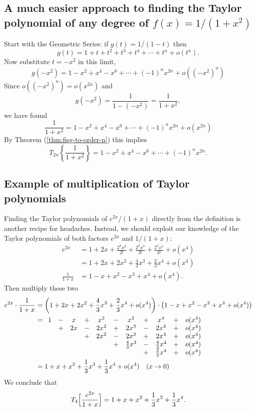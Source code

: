 \subsection{A much easier approach to finding the Taylor polynomial of \textbf{any} degree of $f(x)=1/ (1+x^2)$} %
Start with the Geometric Series: if $g(t)=1/ (1-t)$ then
\[
g(t)=1+t+t^2+t^3+t^4+\cdots+ t^n +o (t^n).
\]
Now substitute $t=-x^2$ in this limit,
\[
g(-x^2) = 1-x^2+x^4-x^6+\cdots+ (-1)^n x^{2n} +o\left(\left(-x^2\right)^n\right)
\]
Since $o\left(\left(-x^2\right)^n\right) = o (x^{2n})$ and
\[
g(-x^2) = \frac1{1- (-x^2)}=\frac1{1+x^2},
\]
we have found
\[
\frac1{1+x^2} = 1-x^2+x^4-x^6+\cdots+ (-1)^n x^{2n} +o (x^{2n})
\]
By Theorem (\ref{thm:fisg-to-order-n}) this implies
\[
T_{2n}\left\{\frac1{1+x^2}\right\} = 1-x^2+x^4-x^6+\cdots+ (-1)^nx^{2n}.
\]


\subsection{Example of multiplication of Taylor polynomials} %
\label{ex:taylor-multiplication}
Finding the Taylor polynomials of $e^{2x}/ (1+x)$ directly from the definition
is another recipe for headaches. Instead, we  should exploit our knowledge
of the Taylor polynomials of both factors $e^{2x}$ and $1/ (1+x)$:
\begin{align*}
  e^{2x}
  & = 1+2x+\frac{2^2x^2}{2!}+\frac{2^3x^3}{3!}+\frac{2^4x^4}{4!}+o (x^4) \\
  &= 1+2x+2x^2+\frac43x^3+\frac23 x^4+o (x^4) \\
  \frac1{1+x} &=1-x+x^2-x^3+x^4+o (x^4).
\end{align*}
Then multiply these two
\begin{align*}
  e^{2x}\cdot\frac1{1+x} &=\left(1+2x+2x^2+\frac43x^3+\frac23 x^4+o
  (x^4)\right)\cdot
  \left(1-x+x^2-x^3+x^4+o (x^4)\right) \\
  &=
  \begin{array}[t]{ccccccccccc}
    1&-& x& + &  x^2 & - &  x^3 & + &  x^4 & + & o (x^4) \\
    &+&2x& - & 2x^2 & + & 2x^3 & - & 2x^4 & + & o (x^4) \\
    & &  & + & 2x^2 & - & 2x^3 & + & 2x^4 & + & o (x^4) \\
    & &  &   & & + & \tfrac43x^3 & - & \tfrac43 x^4 & + & o (x^4) \\
    & &  &   & & & &+&\tfrac23 x^4 & + & o (x^4) \\
  \end{array}
  \\
  &=1+x+x^2+\frac13x^3+\frac13x^4+o (x^4)\quad (x\to0)
\end{align*}
We conclude that 
\[
  T_4\Bigl[\frac{e^{2x}}{1+x}\Bigr] 
  =1+x+x^2+\frac13x^3+\frac13x^4.
\]

